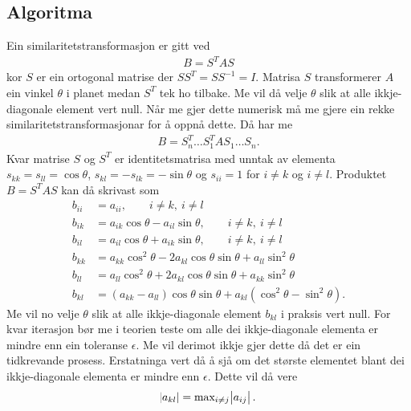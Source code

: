 \documentclass[11pt, a4paper]{article}
\begin{document}
  \subsection{Algoritma}
    Ein similaritetstransformasjon er gitt ved 
    \begin{align*}
      B = S^TAS
    \end{align*}
    kor $S$ er ein ortogonal matrise der $SS^T = SS^{-1} = I$. Matrisa $S$ transformerer $A$ ein vinkel $\theta$ i planet medan $S^T$ tek ho tilbake.
    Me vil då velje $\theta$ slik at alle ikkje-diagonale element vert null. Når me gjer dette numerisk må me gjere ein rekke similaritetstransformasjonar 
    for å oppnå dette. Då har me
    \begin{align*}
      B = S_n^T \dots S_1^TAS_1 \dots S_n.
    \end{align*}
    Kvar matrise $S$ og $S^T$ er identitetsmatrisa med unntak av elementa $s_{kk} = s_{ll} = \cos{\theta}$, $s_{kl} = -s_{lk} = -\sin{\theta}$ og 
    $s_{ii} = 1$ for $i \ne k$ og $i \ne l$. Produktet $B = S^TAS$ kan då skrivast som
    \begin{align*}
      b_{ii} &= a_{ii}, \qquad i \ne k, \ i \ne l \\
      b_{ik} &= a_{ik}\cos{\theta} - a_{il}\sin{\theta}, \qquad i \ne k, \ i \ne l \\
      b_{il} &= a_{il}\cos{\theta} + a_{ik}\sin{\theta}, \qquad i \ne k, \ i \ne l \\
      b_{kk} &= a_{kk}\cos^2{\theta} - 2a_{kl}\cos{\theta}\sin{\theta} + a_{ll}\sin^2{\theta} \\
      b_{ll} &= a_{ll}\cos^2{\theta} + 2a_{kl}\cos{\theta}\sin{\theta} + a_{kk}\sin^2{\theta} \\
      b_{kl} &= (a_{kk} - a_{ll})\cos{\theta}\sin{\theta} + a_{kl}(\cos^2{\theta} - \sin^2{\theta}).
    \end{align*}
    Me vil no velje $\theta$ slik at alle ikkje-diagonale element $b_{kl}$ i praksis vert null. For kvar iterasjon bør me i teorien teste om alle
    dei ikkje-diagonale elementa er mindre enn ein toleranse $\epsilon$. Me vil derimot ikkje gjer dette då det er ein tidkrevande prosess. 
    Erstatninga vert då å sjå om det største elementet blant dei ikkje-diagonale elementa er mindre enn $\epsilon$. Dette vil då vere
    \begin{align*}
      \abs{a_{kl}} = \text{max}_{i \ne j}\abs{a_{ij}}.
    \end{align*}
\end{document}
